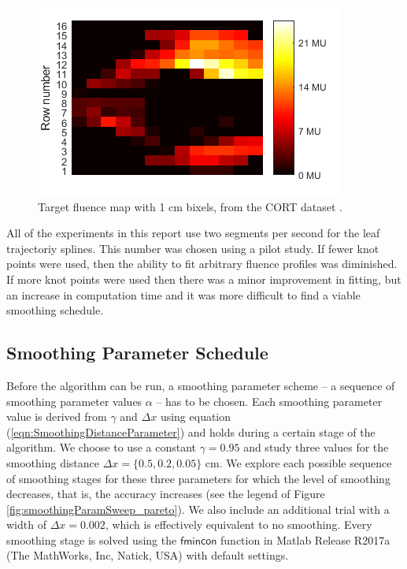 \documentclass{iopart}
\begin{document}
\begin{figure}
  \centering
  \includegraphics[]{fig/FIG_origMap_numbered.png}
  \caption{Target fluence map with 1 cm bixels, from the CORT dataset \cite{CORT14}.}
  \label{fig:targetmap}
\end{figure}

All of the experiments in this report use two segments per second for the leaf trajectoriy splines. This number was chosen using a pilot study.
If fewer knot points were used,  then the ability to fit arbitrary fluence profiles was diminished.
If more knot points were used then there was a minor improvement in fitting, but an increase in computation time and it was more difficult to find a viable smoothing schedule. 


\subsection{Smoothing Parameter Schedule}
Before the algorithm can be run, a smoothing parameter scheme -- a sequence of smoothing parameter values $\alpha$ -- has to be chosen.
Each smoothing parameter value is derived from $\gamma$ and $\Delta x$ using equation (\ref{eqn:SmoothingDistanceParameter}) and holds during a certain stage of the algorithm. 
We choose to use a constant $\gamma = 0.95$ and study three values for the smoothing distance $\Delta x = \{0.5, 0.2, 0.05\}$ cm.
We explore each possible sequence of smoothing stages for these three parameters for which the level of smoothing decreases, that is, the accuracy increases (see the legend of Figure \ref{fig:smoothingParamSweep_pareto}).
We also include an additional trial with a width of $\Delta x = 0.002$, which is effectively equivalent to no smoothing.
Every smoothing stage is solved using the $\mathsf{fmincon}$ function in Matlab Release R2017a (The MathWorks, Inc, Natick, USA) with default settings.
\end{document}
